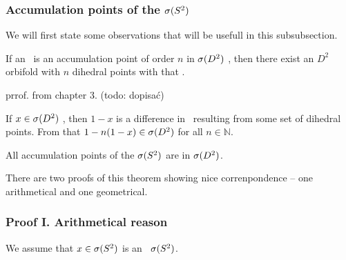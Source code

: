 \subsubsection{Accumulation points of the ${{\sigma}(S^2)}$}
We will first state some observations that will be usefull in this subsubsection.
\begin{observation}
If an \Eoc\ is an accumulation point of order $n$ in ${{\sigma}(D^2)}$ , 
then there exist an $D^2$  
orbifold with $n$ dihedral  points with that \Eoc. 
\end{observation}
prrof. from chapter 3. (todo: dopisać)
\begin{observation}\label{adding_multiplied_differences}
If $x \in {{\sigma}(D^2)}$ , then $1-x$  is 
a difference in 
\Eoc\ resulting 
from some set of dihedral  points. From that $1-n(1-x) \in {{\sigma}(D^2)}$ 
for all $n \in \mathbb{N}$. 
\end{observation}
\begin{theorem}
All accumulation points of the ${{\sigma}(S^2)}$ are in ${{\sigma}(D^2)}$.
\end{theorem}
There are two proofs of this theorem showing nice correnpondence -- one arithmetical and 
one geometrical. 
\subsubsection{Proof I. Arithmetical reason}
We assume that $x \in {{\sigma}(S^2)}$ is an \apots\ ${{\sigma}(S^2)}$.

